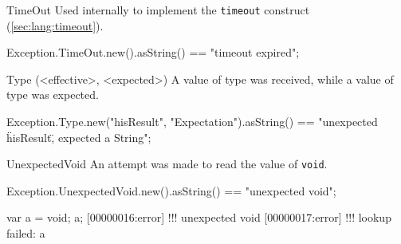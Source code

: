 \begin{urbiscriptapi}
\item[TimeOut]%
  Used internally to implement the \lstinline|timeout| construct
  (\autoref{sec:lang:timeout}).
\begin{urbiassert}
Exception.TimeOut.new().asString()
  == "timeout expired";
\end{urbiassert}


\item[Type](<effective>, <expected>)%
  A value of type  was received, while a value of type
   was expected.
\begin{urbiassert}
Exception.Type.new("hisResult", "Expectation").asString()
  == "unexpected \"hisResult\", expected a String";
\end{urbiassert}


\item[UnexpectedVoid]%
  An attempt was made to read the value of \lstinline|void|.
\begin{urbiassert}
Exception.UnexpectedVoid.new().asString()
  == "unexpected void";
\end{urbiassert}
\begin{urbiscript}
var a = void;
a;
[00000016:error] !!! unexpected void
[00000017:error] !!! lookup failed: a
\end{urbiscript}
\end{urbiscriptapi}


